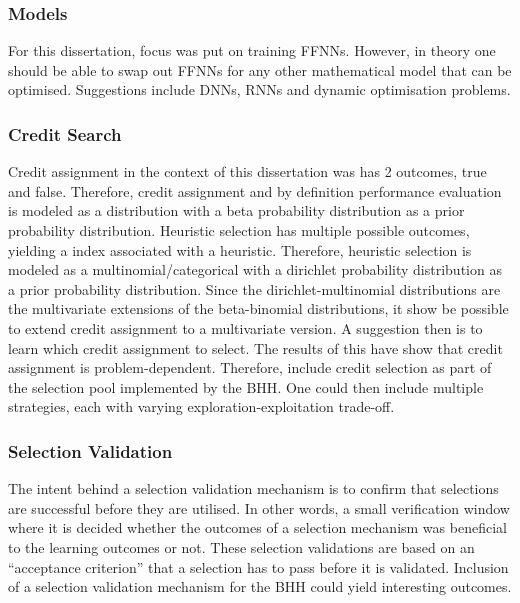 \subsubsection{Models}

For this dissertation, focus was put on training \acp{FFNN}. However, in theory one should be able to swap out \acp{FFNN} for any other mathematical model that can be optimised. Suggestions include \acp{DNN}, \acp{RNN} and dynamic optimisation problems.

\subsubsection{Credit Search}

Credit assignment in the context of this dissertation was has 2 outcomes, true and false. Therefore, credit assignment and by definition performance evaluation is modeled as a  distribution with a beta probability distribution as a prior probability distribution. Heuristic selection has multiple possible outcomes, yielding a index associated with a heuristic. Therefore, heuristic selection is modeled as a multinomial/categorical with a dirichlet probability distribution as a prior probability distribution. Since the dirichlet-multinomial distributions are the multivariate extensions of the beta-binomial distributions, it show be possible to extend credit assignment to a multivariate version. A suggestion then is to learn which credit assignment to select. The results of this have show that credit assignment is problem-dependent. Therefore, include credit selection as part of the selection pool implemented by the \ac{BHH}. One could then include multiple strategies, each with varying exploration-exploitation trade-off.

\subsubsection{Selection Validation}

The intent behind a selection validation mechanism is to confirm that selections are successful before they are utilised. In other words, a small verification window where it is decided whether the outcomes of a selection mechanism was beneficial to the learning outcomes or not. These selection validations are based on an ``acceptance criterion'' that a selection has to pass before it is validated. Inclusion of a selection validation mechanism for the \ac{BHH} could yield interesting outcomes.


